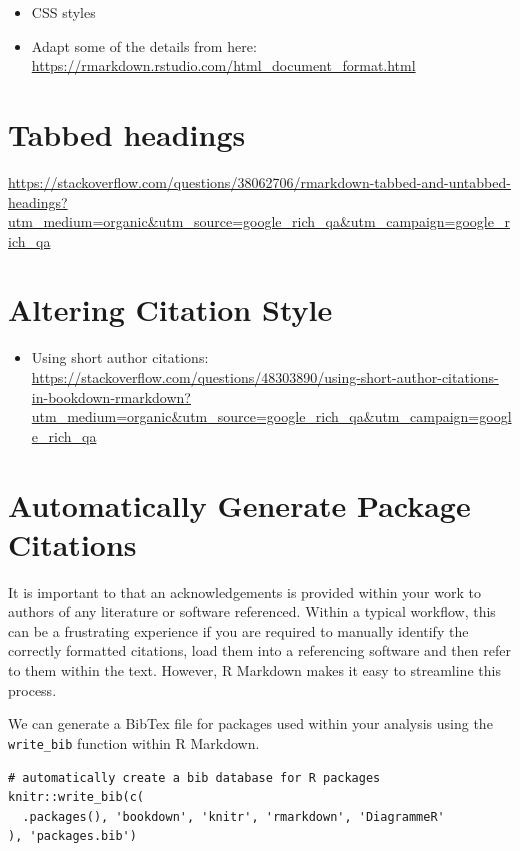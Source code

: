\documentclass[]{book}
\providecommand{\tightlist}{%
  \setlength{\itemsep}{0pt}\setlength{\parskip}{0pt}}
\begin{document}
\begin{itemize}
\tightlist
\item
  CSS styles
\item
  Adapt some of the details from here:
  \url{https://rmarkdown.rstudio.com/html_document_format.html}
\end{itemize}

\section{Tabbed headings}\label{tabbed-headings}

\url{https://stackoverflow.com/questions/38062706/rmarkdown-tabbed-and-untabbed-headings?utm_medium=organic\&utm_source=google_rich_qa\&utm_campaign=google_rich_qa}

\section{Altering Citation Style}\label{altering-citation-style}

\begin{itemize}
\tightlist
\item
  Using short author citations:
  \url{https://stackoverflow.com/questions/48303890/using-short-author-citations-in-bookdown-rmarkdown?utm_medium=organic\&utm_source=google_rich_qa\&utm_campaign=google_rich_qa}
\end{itemize}

\section{Automatically Generate Package
Citations}\label{automatically-generate-package-citations}

It is important to that an acknowledgements is provided within your work
to authors of any literature or software referenced. Within a typical
workflow, this can be a frustrating experience if you are required to
manually identify the correctly formatted citations, load them into a
referencing software and then refer to them within the text. However, R
Markdown makes it easy to streamline this process.

We can generate a BibTex file for packages used within your analysis
using the \texttt{write\_bib} function within R Markdown.

\begin{verbatim}
# automatically create a bib database for R packages
knitr::write_bib(c(
  .packages(), 'bookdown', 'knitr', 'rmarkdown', 'DiagrammeR'
), 'packages.bib')
\end{verbatim}
\end{document}
